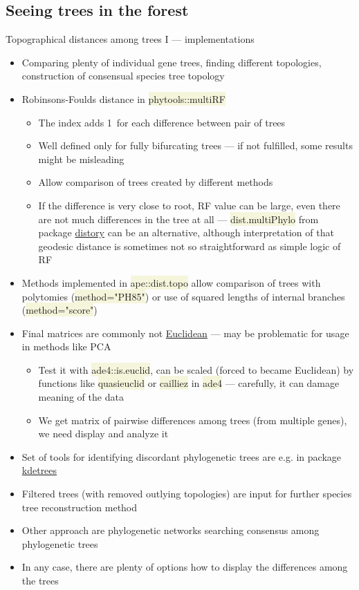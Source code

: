 \documentclass[compress, ucs, xelatex, 11pt, xcolor=svgnames, aspectratio=169,
	hyperref={
		bookmarks=true,
		unicode=true,
		colorlinks=true,
		pdftitle={Molecular data in R},
		plainpages=false,
		pdfauthor={Vojtech Zeisek},
		pdfsubject={Course about phylogeny and evolution in R},
		pdfcreator={XeLaTeX},
		pdfkeywords={R, evolution, phylogeny, molecular data},
		linkcolor=Crimson, %
		anchorcolor=Magenta, %
		citecolor=Magenta, %
		filecolor=Magenta, %
		menucolor=Magenta, %
		urlcolor=DodgerBlue, %
		pdftex},
	url={hyphens, lowtilde} %
	]{beamer}
\renewcommand{\texttt}[1]{\colorbox{Beige}{{\ttfamily #1}}}
\begin{document}
\subsection{Seeing trees in the forest}

\begin{frame}[allowframebreaks]{Topographical distances among trees I --- implementations}
	\begin{itemize}
		\item Comparing plenty of individual gene trees, finding different topologies, construction of consensual species tree topology
		\item Robinsons-Foulds distance in \texttt{phytools::multiRF}
		\begin{itemize}
			\item The index adds 1~for each difference between pair of trees
			\item Well defined only for fully bifurcating trees --- if not fulfilled, some results might be misleading
			\item Allow comparison of trees created by different methods
			\item If the difference is very close to root, RF value can be large, even there are not much differences in the tree at all --- \texttt{dist.multiPhylo} from package \href{https://CRAN.R-project.org/package=distory}{distory} can be an alternative, although interpretation of that geodesic distance is sometimes not so straightforward as simple logic of RF
		\end{itemize}
		\item Methods implemented in \texttt{ape::dist.topo} allow comparison of trees with polytomies (\texttt{method="PH85"}) or use of squared lengths of internal branches (\texttt{method="score"})
		\item Final matrices are commonly not \href{https://en.wikipedia.org/wiki/Euclidean_distance_matrix}{Euclidean} --- may be problematic for usage in methods like PCA
		\begin{itemize}
			\item Test it with \texttt{ade4::is.euclid}, can be scaled (forced to became Euclidean) by functions like \texttt{quasieuclid} or \texttt{cailliez} in \texttt{ade4} --- carefully, it can damage meaning of the data
			\item We get matrix of pairwise differences among trees (from multiple genes), we need display and analyze it
		\end{itemize}
		\item Set of tools for identifying discordant phylogenetic trees are e.g. in package \href{https://CRAN.R-project.org/package=kdetrees}{kdetrees}
		\item Filtered trees (with removed outlying topologies) are input for further species tree reconstruction method
		\item Other approach are phylogenetic networks searching consensus among phylogenetic trees
		\item In any case, there are plenty of options how to display the differences among the trees
	\end{itemize}
\end{frame}
\end{document}
